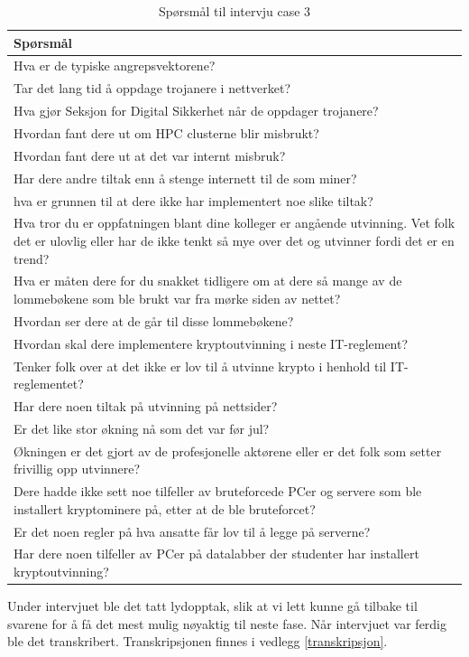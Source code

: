 \begin{table}[H]
    \centering
    \begin{tabular}{|m{30em}|} 
        \hline
        \cellcolor{yellow} Spørsmål  \\
        \hline
        Hva er de typiske angrepsvektorene?  \\
        \hline
        Tar det lang tid å oppdage trojanere i nettverket? \\ 
        \hline
        Hva gjør Seksjon for Digital Sikkerhet når de oppdager trojanere? \\
        \hline
        Hvordan fant dere ut om HPC clusterne blir misbrukt? \\
        \hline
        Hvordan fant dere ut at det var internt misbruk?\\
        \hline
        Har dere andre tiltak enn å stenge internett til de som miner? \\
        \hline
        hva er grunnen til at dere ikke har implementert noe slike tiltak? \\
        \hline
        Hva tror du er oppfatningen blant dine kolleger er angående utvinning. Vet folk det er ulovlig eller har de ikke tenkt så mye over det og utvinner fordi det er en trend? \\
        \hline
        Hva er måten dere for du snakket tidligere om at dere så mange av de lommebøkene som ble brukt var fra mørke siden av nettet?  \\
        \hline
        Hvordan ser dere at de går til disse lommebøkene? \\
        \hline
        Hvordan skal dere implementere kryptoutvinning i neste IT-reglement? \\
        \hline
        Tenker folk over at det ikke er lov til å utvinne krypto i henhold til IT-reglementet? \\
        \hline
        Har dere noen tiltak på utvinning på nettsider? \\
        \hline
        Er det like stor økning nå som det var før jul? \\
        \hline
        Økningen er det gjort av de profesjonelle aktørene eller er det folk som setter frivillig opp utvinnere? \\
        \hline
        Dere hadde ikke sett noe tilfeller av bruteforcede PCer og servere som ble installert kryptominere på, etter at de ble bruteforcet?  \\
        \hline
        Er det noen regler på hva ansatte får lov til å legge på serverne? \\
        \hline
        Har dere noen tilfeller av PCer på datalabber der studenter har installert kryptoutvinning? \\
        \hline
    \end{tabular}
    \caption{Spørsmål til intervju case 3}
    \label{tab:spm-intervju}
\end{table}
Under intervjuet ble det tatt lydopptak, slik at vi lett kunne gå tilbake til svarene for å få det mest mulig nøyaktig til neste fase. Når intervjuet var ferdig ble det transkribert. Transkripsjonen finnes i vedlegg \ref{transkripsjon}.
